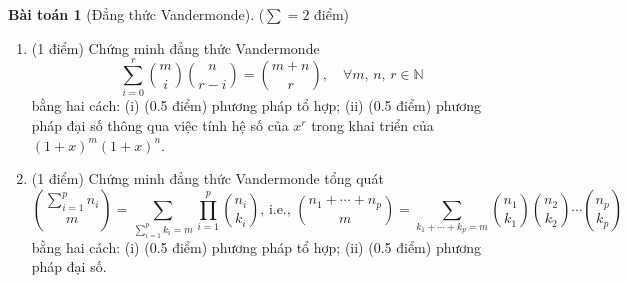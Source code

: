 \documentclass[a4paper, 11pt]{article}
\theoremstyle{definition}
\newtheorem{baitoan}{Bài toán}
\begin{document}
	\begin{tcolorbox}[breakable]
    	\begin{baitoan}[Đẳng thức Vandermonde]
			($\sum = 2$ điểm) 
			\begin{enumerate}[label=(\alph*)]
				\item (1 điểm) Chứng minh đẳng thức Vandermonde $$\sum\limits_{i=0}^r {m \choose i} {n \choose r-i} = {m+n \choose r},\quad\forall m,\,n,\,r\in \mathbb{N}$$ bằng hai cách: (i) (0.5 điểm) phương pháp tổ hợp; (ii) (0.5 điểm) phương pháp đại số thông qua việc tính hệ số của $x^r$ trong khai triển của $(1+x)^m(1+x)^n$.
				\item (1 điểm) Chứng minh đẳng thức Vandermonde tổng quát $${\sum\limits_{i=1}^p n_i \choose m} = \sum\limits_{\sum\limits_{i=1}^p k_i = m} \prod\limits_{i=1}^p {n_i \choose k_i},\,\text{i.e., }{n_1 + \cdots + n_p \choose m} = \sum\limits_{k_1+\cdots+k_p = m} {n_1\choose k_1}{n_2\choose k_2}\cdots{n_p\choose k_p}$$ bằng hai cách: (i) (0.5 điểm) phương pháp tổ hợp; (ii) (0.5 điểm) phương pháp đại số.
			\end{enumerate}
		\end{baitoan}
	\end{tcolorbox}
\end{document}
